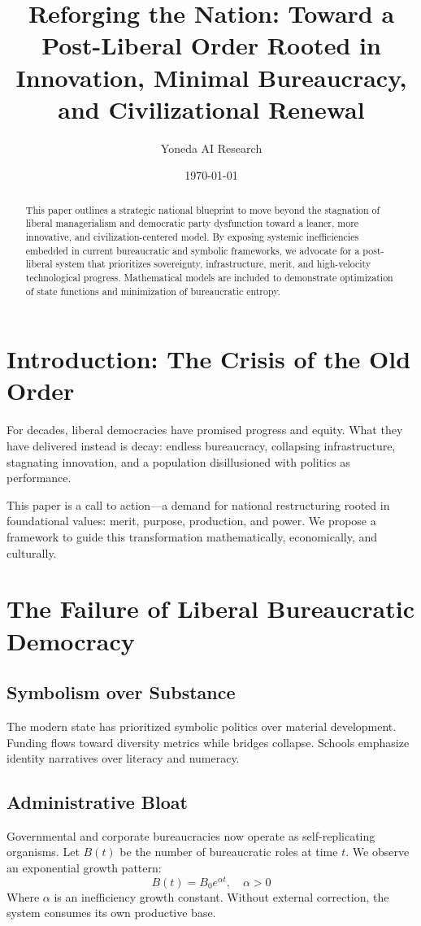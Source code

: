\documentclass[11pt]{article}
\title{\textbf{Reforging the Nation: Toward a Post-Liberal Order Rooted in Innovation, Minimal Bureaucracy, and Civilizational Renewal}}
\author[1]{Yoneda AI Research}
\date{\today}
\begin{document}
\maketitle

\begin{abstract}
This paper outlines a strategic national blueprint to move beyond the stagnation of liberal managerialism and democratic party dysfunction toward a leaner, more innovative, and civilization-centered model. By exposing systemic inefficiencies embedded in current bureaucratic and symbolic frameworks, we advocate for a post-liberal system that prioritizes sovereignty, infrastructure, merit, and high-velocity technological progress. Mathematical models are included to demonstrate optimization of state functions and minimization of bureaucratic entropy.
\end{abstract}

\section{Introduction: The Crisis of the Old Order}
For decades, liberal democracies have promised progress and equity. What they have delivered instead is decay: endless bureaucracy, collapsing infrastructure, stagnating innovation, and a population disillusioned with politics as performance.

This paper is a call to action—a demand for national restructuring rooted in foundational values: merit, purpose, production, and power. We propose a framework to guide this transformation mathematically, economically, and culturally.

\section{The Failure of Liberal Bureaucratic Democracy}
\subsection{Symbolism over Substance}
The modern state has prioritized symbolic politics over material development. Funding flows toward diversity metrics while bridges collapse. Schools emphasize identity narratives over literacy and numeracy.

\subsection{Administrative Bloat}
Governmental and corporate bureaucracies now operate as self-replicating organisms. Let $B(t)$ be the number of bureaucratic roles at time $t$. We observe an exponential growth pattern:
\begin{equation}
B(t) = B_0 e^{\alpha t}, \quad \alpha > 0
\end{equation}
Where $\alpha$ is an inefficiency growth constant. Without external correction, the system consumes its own productive base.
\end{document}
